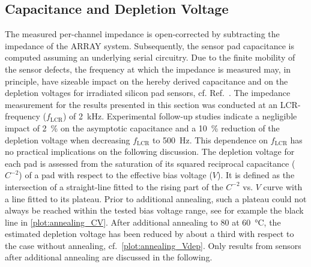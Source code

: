 \subsection{Capacitance and Depletion Voltage}
\label{subsec:Udep}
The measured per-channel impedance is open-corrected by subtracting the impedance of the ARRAY system.
Subsequently, the sensor pad capacitance is computed assuming an underlying serial circuitry.
Due to the finite mobility of the sensor defects, the frequency at which the impedance is measured may, in principle, have sizeable impact on the hereby derived capacitance and on the depletion voltages for irradiated silicon pad sensors, cf. Ref.~\cite{Li1991}.
The impedance measurement for the results presented in this section was conducted at an LCR-frequency ($f_\text{LCR}$) of \SI{2}{\kilo\hertz}.
Experimental follow-up studies indicate a negligible impact of \SI{2}{\percent} on the asymptotic capacitance and a \SI{10}{\percent} reduction of the depletion voltage when decreasing $f_\text{LCR}$ to \SI{500}{\hertz}.
This dependence on $f_\text{LCR}$ has no practical implications on the following discussion.
The depletion voltage for each pad is assessed from the saturation of its squared reciprocal capacitance ($C^{-2}$) of a pad with respect to the effective bias voltage ($V$). 
It is defined as the intersection of a straight-line fitted to the rising part of the $C^{-2}$ vs. $V$ curve with a line fitted to its plateau.
Prior to additional annealing, such a plateau could not always be reached within the tested bias voltage range, see for example the black line in \ref{plot:annealing_CV}. 
After additional annealing to \SI{80}{\min} at \SI{60}{\celsius}, the estimated depletion voltage has been reduced by about a third with respect to the case without annealing, cf.~\ref{plot:annealing_Vdep}.
Only results from sensors after additional annealing are discussed in the following. 

